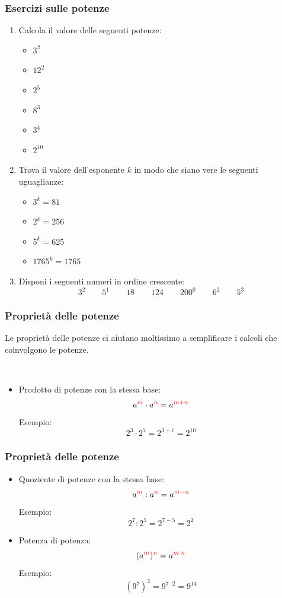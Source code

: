 \documentclass[handout]{beamer}
\theoremstyle{plain}
\begin{document}
\begin{frame}
\frametitle{Esercizi sulle potenze}
\begin{enumerate}
  \item Calcola il valore delle seguenti potenze:
  \begin{multicols}{2}
    \begin{itemize}
        \item $ 3^2 $
        \item $ 12^2 $
        \item $ 2^5 $
        \item $ 8^3 $
        \item $ 3^4 $
        \item $ 2^{10} $
    \end{itemize}
  \end{multicols}
  \item Trova il valore dell'esponente $ k $ in modo che siano vere le seguenti uguaglianze:
  \begin{multicols}{2}
    \begin{itemize}
        \item $ 3^k = 81 $
        \item $ 2^k = 256 $
        \item $ 5^k = 625 $
        \item $ 1765^k = 1765 $
    \end{itemize}
  \end{multicols}
  \item Disponi i seguenti numeri in ordine crescente:
  \[ 3^2\qquad 5^1\qquad 18\qquad 124\qquad 200^0\qquad 6^2\qquad 5^3 \]
\end{enumerate}
\end{frame}


\begin{frame}
\frametitle{Proprietà delle potenze}
Le proprietà delle potenze ci aiutano moltissimo a semplificare i calcoli che coinvolgono le potenze.\pause

~

\begin{itemize}
  \item Prodotto di potenze con la stessa base:
  \[a^{\textcolor{red}{m}} \cdot a^{\textcolor{red}{n}} = a^{\textcolor{red}{m+n}}\]
  Esempio:
  \[2^3 \cdot 2^7 = 2^{3+7} = 2^{10} \]
\end{itemize}
\end{frame}


\begin{frame}
\frametitle{Proprietà delle potenze}
\begin{itemize}
  \item Quoziente di potenze con la stessa base:
  \[a^{\textcolor{red}{m}} : a^{\textcolor{red}{n}} = a^{\textcolor{red}{m-n}}\]
  Esempio:
  \[2^7 : 2^5 = 2^{7-5} = 2^{2} \]\pause
  \item Potenza di potenza:\[(a^{\textcolor{red}{m}})^{\textcolor{red}{n}} = a^{\textcolor{red}{m\cdot n}}\]
  Esempio:
  \[(9^7)^2 = 9^{7\cdot 2} = 9^{14} \]
\end{itemize}
\end{frame}
\end{document}
